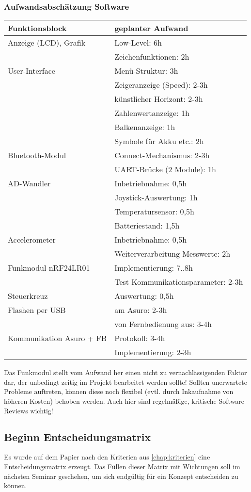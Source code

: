 \subsubsection{Aufwandsabschätzung Software} 
\begin{tabular}{l|l}
	Funktionsblock & geplanter Aufwand\\
	\hline
	Anzeige (LCD), Grafik & Low-Level: 6h \\
	& Zeichenfunktionen: 2h \\
	\hline
	User-Interface & Menü-Struktur: 3h \\
	& Zeigeranzeige (Speed): 2-3h \\
	& künstlicher Horizont: 2-3h \\
	& Zahlenwertanzeige: 1h \\
	& Balkenanzeige: 1h \\
	& Symbole für Akku etc.: 2h\\
	\hline
	Bluetooth-Modul & Connect-Mechanismus: 2-3h \\
	& UART-Brücke (2 Module): 1h \\
	\hline
	AD-Wandler & Inbetriebnahme: 0,5h \\
	& Joystick-Auswertung: 1h\\
	& Temperatursensor: 0,5h\\
	& Batteriestand: 1,5h\\
	\hline
	Accelerometer & Inbetriebnahme: 0,5h \\
	& Weiterverarbeitung Messwerte: 2h \\
	\hline
	Funkmodul nRF24LR01 & Implementierung: 7..8h \\
	& Test Kommunikationsparameter: 2-3h \\
	\hline
	Steuerkreuz & Auswertung: 0,5h\\
	\hline
	Flashen per USB & am Asuro: 2-3h\\
	& von Fernbedienung aus: 3-4h\\
	\hline
	Kommunikation Asuro + FB & Protokoll: 3-4h\\
	& Implementierung: 2-3h 
\end{tabular}

Das Funkmodul stellt vom Aufwand her einen nicht zu vernachlässigenden Faktor dar, der unbedingt zeitig im Projekt bearbeitet werden sollte! Sollten unerwartete Probleme auftreten, können diese noch flexibel (evtl. durch Inkaufnahme von höheren Kosten) behoben werden.
Auch hier sind regelmäßige, kritische Software-Reviews wichtig!

\subsection{Beginn Entscheidungsmatrix}
Es wurde auf dem Papier nach den Kriterien aus \autoref{chap:kriterien} eine Entscheidungsmatrix erzeugt. Das Füllen dieser Matrix mit Wichtungen soll im nächsten Seminar geschehen, um sich endgültig für ein Konzept entscheiden zu können.